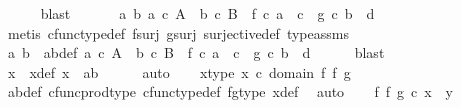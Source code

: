 \begin{isabellebody}
\ \ \ \ \isamarkupfalse%
\ blast\isanewline
\ \ \isamarkupfalse%
\ \isamarkupfalse%
\ {\isachardoublequoteopen}{\isasymexists}\ a\ b{\isachardot}{\kern0pt}\ a\ {\isasymin}\isactrlsub c\ A\ {\isasymand}\ b\ {\isasymin}\isactrlsub c\ B\ {\isasymand}\ f\ {\isasymcirc}\isactrlsub c\ a\ {\isacharequal}{\kern0pt}\ c\ {\isasymand}\ g\ {\isasymcirc}\isactrlsub c\ b\ {\isacharequal}{\kern0pt}\ d{\isachardoublequoteclose}\isanewline
\ \ \ \ \isamarkupfalse%
\ {\isacharparenleft}{\kern0pt}metis\ cfunc{\isacharunderscore}{\kern0pt}type{\isacharunderscore}{\kern0pt}def\ f{\isacharunderscore}{\kern0pt}surj\ g{\isacharunderscore}{\kern0pt}surj\ surjective{\isacharunderscore}{\kern0pt}def\ type{\isacharunderscore}{\kern0pt}assms{\isacharparenright}{\kern0pt}\isanewline
\ \ \isamarkupfalse%
\ \isamarkupfalse%
\ a\ b\ \ ab{\isacharunderscore}{\kern0pt}def{\isacharcolon}{\kern0pt}\ {\isachardoublequoteopen}a\ {\isasymin}\isactrlsub c\ A\ {\isasymand}\ b\ {\isasymin}\isactrlsub c\ B\ {\isasymand}\ f\ {\isasymcirc}\isactrlsub c\ a\ {\isacharequal}{\kern0pt}\ c\ {\isasymand}\ g\ {\isasymcirc}\isactrlsub c\ b\ {\isacharequal}{\kern0pt}\ d{\isachardoublequoteclose}\isanewline
\ \ \ \ \isamarkupfalse%
\ blast\isanewline
\ \ \isamarkupfalse%
\ \isamarkupfalse%
\ x\ \ x{\isacharunderscore}{\kern0pt}def{\isacharcolon}{\kern0pt}\ {\isachardoublequoteopen}x\ {\isacharequal}{\kern0pt}\ {\isasymlangle}a{\isacharcomma}{\kern0pt}b{\isasymrangle}{\isachardoublequoteclose}\isanewline
\ \ \ \ \isamarkupfalse%
\ auto\isanewline
\ \ \isamarkupfalse%
\ x{\isacharunderscore}{\kern0pt}type{\isacharcolon}{\kern0pt}\ {\isachardoublequoteopen}x\ {\isasymin}\isactrlsub c\ domain\ {\isacharparenleft}{\kern0pt}f\ {\isasymtimes}\isactrlsub f\ g{\isacharparenright}{\kern0pt}{\isachardoublequoteclose}\isanewline
\ \ \ \ \isamarkupfalse%
\ ab{\isacharunderscore}{\kern0pt}def\ cfunc{\isacharunderscore}{\kern0pt}prod{\isacharunderscore}{\kern0pt}type\ cfunc{\isacharunderscore}{\kern0pt}type{\isacharunderscore}{\kern0pt}def\ fg{\isacharunderscore}{\kern0pt}type\ x{\isacharunderscore}{\kern0pt}def\ \isamarkupfalse%
\ auto\isanewline
\ \ \isamarkupfalse%
\ {\isachardoublequoteopen}{\isacharparenleft}{\kern0pt}f\ {\isasymtimes}\isactrlsub f\ g{\isacharparenright}{\kern0pt}\ {\isasymcirc}\isactrlsub c\ x\ {\isacharequal}{\kern0pt}\ y{\isachardoublequoteclose}\isanewline

\end{isabellebody}
